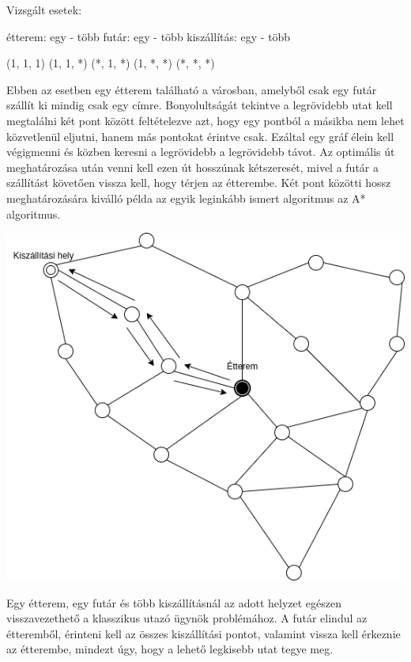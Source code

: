 

Vizsgált esetek:

étterem: egy - több
futár: egy - több
kiszállítás: egy - több

(1, 1, 1)
(1, 1, *)
(*, 1, *)
(1, *, *)
(*, *, *)


Ebben az esetben egy étterem található a városban, amelyből csak egy futár szállít ki mindig csak egy címre.
Bonyolultságát tekintve a legrövidebb utat kell megtalálni két pont között feltételezve azt, hogy egy pontból a másikba nem lehet közvetlenül eljutni, hanem más pontokat érintve csak. Ezáltal egy gráf élein kell végigmenni és közben keresni a legrövidebb a legrövidebb távot. Az optimális út meghatározása után venni kell ezen út hosszúnak kétszeresét, mivel a futár a szállítást követően vissza kell, hogy térjen az étterembe. Két pont közötti hossz meghatározására kiválló példa az egyik leginkább ismert algoritmus az A* algoritmus.

\includegraphics[scale=0.5]{images/Astar.png}


Egy étterem, egy futár és több kiszállításnál az adott helyzet egészen visszavezethető a klasszikus utazó ügynök problémához.
A futár elindul az étteremből, érinteni kell az összes kiszállítási pontot, valamint vissza kell érkeznie az étterembe, mindezt úgy, hogy a lehető legkisebb utat tegye meg.

